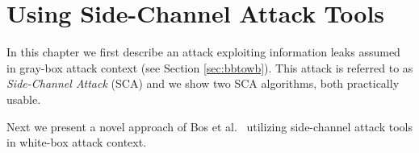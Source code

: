 \chapter{Using Side-Channel Attack Tools}
\label{chap:attack}

In this chapter we first describe an attack exploiting information leaks assumed in gray-box attack context (see Section \ref{sec:bbtowb}). This attack is referred to as {\em Side-Channel Attack} (SCA) and we show two SCA algorithms, both practically usable.

Next we present a novel approach of Bos et al.\ \cite{bos2015differential} utilizing side-channel attack tools in white-box attack context.





